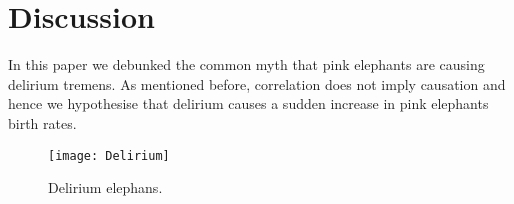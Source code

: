 \section{Discussion}\label{sec:Discussion}

In this paper we debunked the common myth that pink elephants are causing delirium tremens. As mentioned before, correlation does not imply causation and hence we hypothesise that delirium causes a sudden increase in pink elephants birth rates.
\begin{figure}[h]
	\centering
	\texttt{[image: Delirium]}
	\caption{Delirium elephans.}
	\label{fig:ElephantTremens}
\end{figure}
